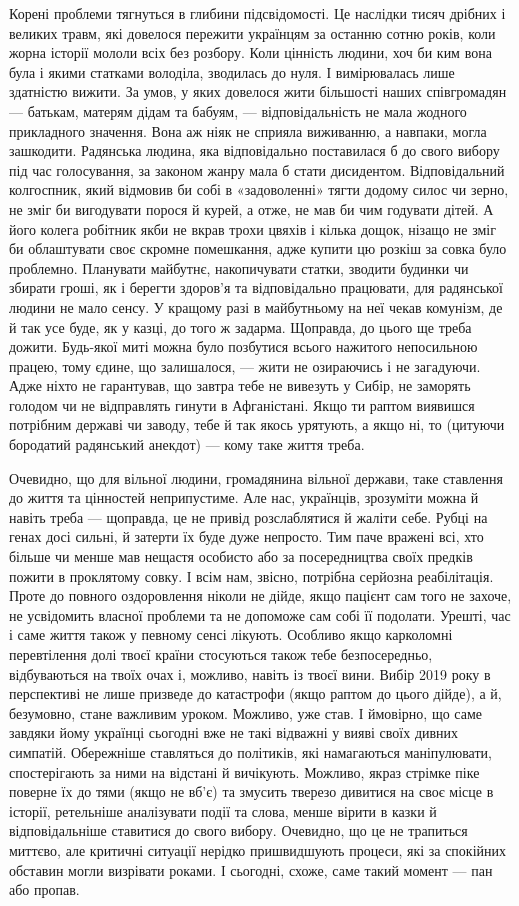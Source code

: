Корені проблеми тягнуться в глибини підсвідомості. Це наслідки тисяч дрібних і
великих травм, які довелося пережити українцям за останню сотню років, коли
жорна історії мололи всіх без розбору. Коли цінність людини, хоч би ким вона
була і якими статками володіла, зводилась до нуля. І вимірювалась лише
здатністю вижити. За умов, у яких довелося жити більшості наших співгромадян —
батькам, матерям дідам та бабуям, — відповідальність не мала жодного
прикладного значення. Вона аж ніяк не сприяла виживанню, а навпаки, могла
зашкодити. Радянська людина, яка відповідально поставилася б до свого вибору
під час голосування, за законом жанру мала б стати дисидентом. Відповідальний
колгоспник, який відмовив би собі в «задоволенні» тягти додому силос чи зерно,
не зміг би вигодувати порося й курей, а отже, не мав би чим годувати дітей. А
його колега робітник якби не вкрав трохи цвяхів і кілька дощок, нізащо не зміг
би облаштувати своє скромне помешкання, адже купити цю розкіш за совка було
проблемно. Планувати майбутнє, накопичувати статки, зводити будинки чи збирати
гроші, як і берегти здоров’я та відповідально працювати, для радянської людини
не мало сенсу. У кращому разі в майбутньому на неї чекав комунізм, де й так усе
буде, як у казці, до того ж задарма. Щоправда, до цього ще треба дожити.
Будь-якої миті можна було позбутися всього нажитого непосильною працею, тому
єдине, що залишалося, — жити не озираючись і не загадуючи. Адже ніхто не
гарантував, що завтра тебе не вивезуть у Сибір, не заморять голодом чи не
відправлять гинути в Афганістані. Якщо ти раптом виявишся потрібним державі чи
заводу, тебе й так якось урятують, а якщо ні, то (цитуючи бородатий радянський
анекдот) — кому таке життя треба.

Очевидно, що для вільної людини, громадянина вільної держави, таке ставлення до
життя та цінностей неприпустиме. Але нас, українців, зрозуміти можна й навіть
треба — щоправда, це не привід розслаблятися й жаліти себе. Рубці на генах досі
сильні, й затерти їх буде дуже непросто. Тим паче вражені всі, хто більше чи
менше мав нещастя особисто або за посередництва своїх предків пожити в
проклятому совку. І всім нам, звісно, потрібна серйозна реабілітація. Проте до
повного оздоровлення ніколи не дійде, якщо пацієнт сам того не захоче, не
усвідомить власної проблеми та не допоможе сам собі її подолати. Урешті, час і
саме життя також у певному сенсі лікують. Особливо якщо карколомні перевтілення
долі твоєї країни стосуються також тебе безпосередньо, відбуваються на твоїх
очах і, можливо, навіть із твоєї вини. Вибір 2019 року в перспективі не лише
призведе до катастрофи (якщо раптом до цього дійде), а й, безумовно, стане
важливим уроком. Можливо, уже став. І ймовірно, що саме завдяки йому українці
сьогодні вже не такі відважні у вияві своїх дивних симпатій. Обережніше
ставляться до політиків, які намагаються маніпулювати, спостерігають за ними на
відстані й вичікують. Можливо, якраз стрімке піке поверне їх до тями (якщо не
вб’є) та змусить тверезо дивитися на своє місце в історії, ретельніше
аналізувати події та слова, менше вірити в казки й відповідальніше ставитися до
свого вибору. Очевидно, що це не трапиться миттєво, але критичні ситуації
нерідко пришвидшують процеси, які за спокійних обставин могли визрівати роками.
І сьогодні, схоже, саме такий момент — пан або пропав. 
